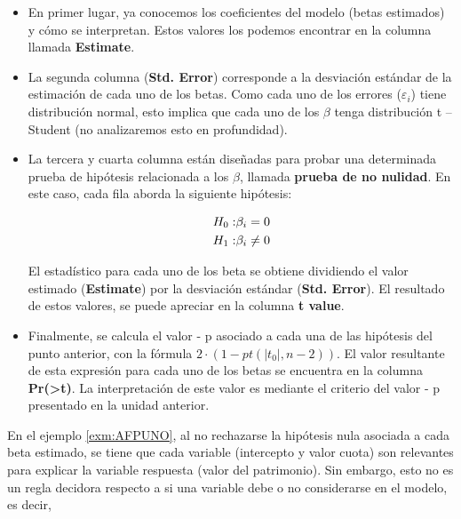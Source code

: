 \documentclass[
  11pt,
]{book}
\theoremstyle{definition}
\theoremstyle{definition}
\theoremstyle{definition}
\theoremstyle{definition}
\theoremstyle{remark}
\begin{document}
\begin{itemize}
\item
  En primer lugar, ya conocemos los coeficientes del modelo (betas estimados) y cómo se interpretan. Estos valores los podemos encontrar en la columna llamada \textbf{Estimate}.
\item
  La segunda columna (\textbf{Std. Error}) corresponde a la desviación estándar de la estimación de cada uno de los betas. Como cada uno de los errores (\(\varepsilon_i\)) tiene distribución normal, esto implica que cada uno de los \(\beta\) tenga distribución t -- Student (no analizaremos esto en profundidad).
\item
  La tercera y cuarta columna están diseñadas para probar una determinada prueba de hipótesis relacionada a los \(\beta\), llamada \textbf{prueba de no nulidad}. En este caso, cada fila aborda la siguiente hipótesis:

  \begin{equation}
  \notag
  \begin{split}
  H_0:&\beta_i = 0\\
  H_1:&\beta_i \neq 0\\
  \end{split}
  \end{equation}

  El estadístico para cada uno de los beta se obtiene dividiendo el valor estimado (\textbf{Estimate}) por la desviación estándar (\textbf{Std. Error}). El resultado de estos valores, se puede apreciar en la columna \textbf{t value}.
\item
  Finalmente, se calcula el valor - p asociado a cada una de las hipótesis del punto anterior, con la fórmula \(2\cdot(1-pt(|t_0|, n-2))\). El valor resultante de esta expresión para cada uno de los betas se encuentra en la columna \textbf{Pr(\textgreater\textbar t\textbar)}. La interpretación de este valor es mediante el criterio del valor - p presentado en la unidad anterior.
\end{itemize}

En el ejemplo \ref{exm:AFPUNO}, al no rechazarse la hipótesis nula asociada a cada beta estimado, se tiene que cada variable (intercepto y valor cuota) son relevantes para explicar la variable respuesta (valor del patrimonio). Sin embargo, esto no es un regla decidora respecto a si una variable debe o no considerarse en el modelo, es decir,
\end{document}
